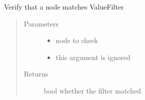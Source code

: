 \documentclass[a4paper,10pt,english]{sphinxmanual}
\begin{document}
\begin{fulllineitems}
\begin{fulllineitems}
\label{\detokenize{fagus.filters:fagus.filters.VFil.match_node}}
\pysigstartsignatures
{}
\pysigstopsignatures
\sphinxAtStartPar
Verify that a node matches ValueFilter
\begin{quote}\begin{description}
\item[{Parameters}] \leavevmode\begin{itemize}
\item {}
\sphinxAtStartPar
{} \textendash{} node to check

\item {}
\sphinxAtStartPar
\sphinxstyleliteralstrong{\sphinxupquote{\_}} \textendash{} this argument is ignored

\end{itemize}

\item[{Returns}] \leavevmode
\sphinxAtStartPar
bool whether the filter matched

\end{description}\end{quote}

\end{fulllineitems}


\begin{fulllineitems}
\label{\detokenize{fagus.filters:fagus.filters.VFil.__annotations__}}
\pysigstartsignatures
{}
\pysigstopsignatures
\end{fulllineitems}


\begin{fulllineitems}
\label{\detokenize{fagus.filters:fagus.filters.VFil.__module__}}
\pysigstartsignatures
{}
\pysigstopsignatures
\end{fulllineitems}


\end{fulllineitems}
\end{document}
